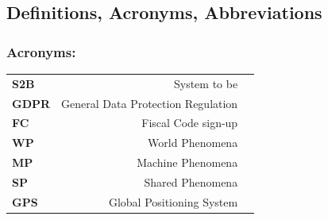 \documentclass[titlepage]{article}
\begin{document}
\subsection{Definitions, Acronyms, Abbreviations}




\subsubsection{Acronyms:}

\begin{tabular}{|l|rl|}
\hline

\textbf{S2B}	& System to be 	&				 			 \\
\textbf{GDPR}	& General Data Protection Regulation &	     \\
\textbf{FC}     & Fiscal Code    	sign-up	&	 				 \\
\textbf{WP}     & World Phenomena       &	 				 \\
\textbf{MP}     & Machine Phenomena     &	 				 \\
\textbf{SP}     & Shared Phenomena      &     				 \\
\textbf{GPS}    & Global Positioning System &	 			 \\

\hline
\end{tabular}
\end{document}
